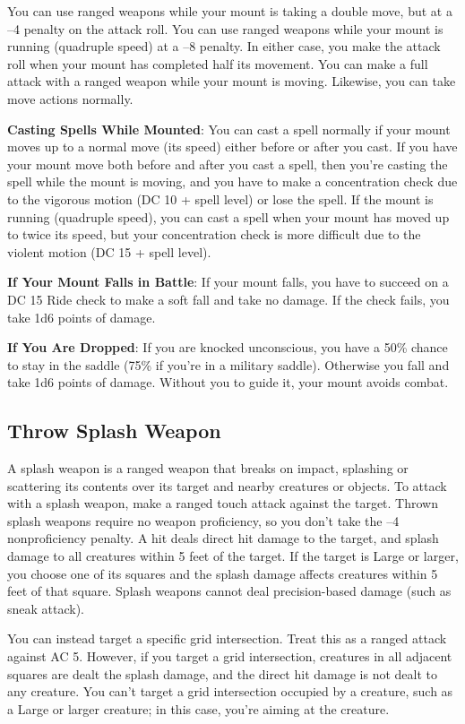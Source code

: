 You can use ranged weapons while your mount is taking a double move, but at a --4 penalty on the attack roll. You can use ranged weapons while your mount is running (quadruple speed) at a --8 penalty. In either case, you make the attack roll when your mount has completed half its movement. You can make a full attack with a ranged weapon while your mount is moving. Likewise, you can take move actions normally.
				
\textbf{Casting Spells While Mounted}: You can cast a spell normally if your mount moves up to a normal move (its speed) either before or after you cast. If you have your mount move both before and after you cast a spell, then you're casting the spell while the mount is moving, and you have to make a concentration check due to the vigorous motion (DC 10 + spell level) or lose the spell. If the mount is running (quadruple speed), you can cast a spell when your mount has moved up to twice its speed, but your concentration check is more difficult due to the violent motion (DC 15 + spell level).
				
\textbf{If Your Mount Falls in Battle}: If your mount falls, you have to succeed on a DC 15 Ride check to make a soft fall and take no damage. If the check fails, you take 1d6 points of damage.
				
\textbf{If You Are Dropped}: If you are knocked unconscious, you have a 50\% chance to stay in the saddle (75\% if you're in a military saddle). Otherwise you fall and take 1d6 points of damage. Without you to guide it, your mount avoids combat.
				
\subsection{Throw Splash Weapon}

				
A splash weapon is a ranged weapon that breaks on impact, splashing or scattering its contents over its target and nearby creatures or objects. To attack with a splash weapon, make a ranged touch attack against the target. Thrown splash weapons require no weapon proficiency, so you don't take the --4 nonproficiency penalty. A hit deals direct hit damage to the target, and splash damage to all creatures within 5 feet of the target. If the target is Large or larger, you choose one of its squares and the splash damage affects creatures within 5 feet of that square. Splash weapons cannot deal precision-based damage (such as sneak attack). 
				
You can instead target a specific grid intersection. Treat this as a ranged attack against AC 5. However, if you target a grid intersection, creatures in all adjacent squares are dealt the splash damage, and the direct hit damage is not dealt to any creature. You can't target a grid intersection occupied by a creature, such as a Large or larger creature; in this case, you're aiming at the creature.
				
